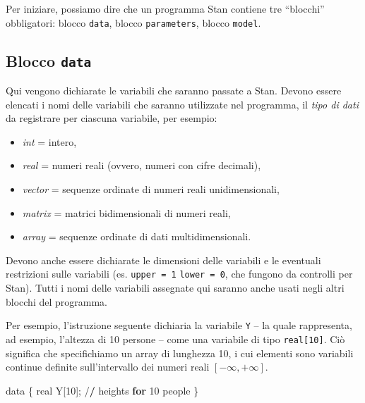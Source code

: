 \documentclass[
  11pt,
]{krantz}
\makeatletter
\newenvironment{Shaded}{\begin{snugshade}}{\end{snugshade}}
\newcommand{\ControlFlowTok}[1]{\textcolor[rgb]{0.27,0.27,0.27}{\textbf{#1}}}
\newcommand{\DecValTok}[1]{\textcolor[rgb]{0.06,0.06,0.06}{#1}}
\newcommand{\ErrorTok}[1]{\textcolor[rgb]{0.14,0.14,0.14}{\textbf{#1}}}
\newcommand{\NormalTok}[1]{#1}
\newcommand{\SpecialCharTok}[1]{\textcolor[rgb]{0,0,0}{#1}}
\providecommand{\tightlist}{%
  \setlength{\itemsep}{0pt}\setlength{\parskip}{0pt}}
\newenvironment{kframe}{%
\medskip{}
\setlength{\fboxsep}{.8em}
 \def\at@end@of@kframe{}%
 \ifinner\ifhmode%
  \def\at@end@of@kframe{\end{minipage}}%
  \begin{minipage}{\columnwidth}%
 \fi\fi%
 \def\FrameCommand##1{\hskip\@totalleftmargin \hskip-\fboxsep
 \colorbox{shadecolor}{##1}\hskip-\fboxsep
     \hskip-\linewidth \hskip-\@totalleftmargin \hskip\columnwidth}%
 \MakeFramed {\advance\hsize-\width
   \@totalleftmargin\z@ \linewidth\hsize
   \@setminipage}}%
 {\par\unskip\endMakeFramed%
 \at@end@of@kframe}
\renewenvironment{Shaded}{\begin{kframe}}{\end{kframe}}
\theoremstyle{definition}
\theoremstyle{definition}
\theoremstyle{definition}
\theoremstyle{definition}
\theoremstyle{remark}
\makeatother
\begin{document}
Per iniziare, possiamo dire che un programma Stan contiene tre ``blocchi'' obbligatori: blocco \texttt{data}, blocco \texttt{parameters}, blocco \texttt{model}.

\hypertarget{blocco-data}{%
\subsection{\texorpdfstring{Blocco \texttt{data}}{Blocco data}}\label{blocco-data}}

Qui vengono dichiarate le variabili che saranno passate a Stan. Devono essere elencati i nomi delle variabili che saranno utilizzate nel programma, il \emph{tipo di dati} da registrare per ciascuna variabile, per esempio:

\begin{itemize}
\tightlist
\item
  \emph{int} = intero,
\item
  \emph{real} = numeri reali (ovvero, numeri con cifre decimali),
\item
  \emph{vector} = sequenze ordinate di numeri reali unidimensionali,
\item
  \emph{matrix} = matrici bidimensionali di numeri reali,
\item
  \emph{array} = sequenze ordinate di dati multidimensionali.
\end{itemize}

Devono anche essere dichiarate le dimensioni delle variabili e le eventuali restrizioni sulle variabili (es. \texttt{upper\ =\ 1} \texttt{lower\ =\ 0}, che fungono da controlli per Stan). Tutti i nomi delle variabili assegnate qui saranno anche usati negli altri blocchi del programma.

Per esempio, l'istruzione seguente dichiaria la variabile \texttt{Y} -- la quale rappresenta, ad esempio, l'altezza di 10 persone -- come una variabile di tipo \texttt{real{[}10{]}}. Ciò significa che specifichiamo un array di lunghezza 10, i cui elementi sono variabili continue definite sull'intervallo dei numeri reali \([-\infty, +\infty]\).

\begin{Shaded}
\begin{Highlighting}[]
\NormalTok{data \{}
\NormalTok{  real Y[}\DecValTok{10}\NormalTok{]; }\SpecialCharTok{/}\ErrorTok{/}\NormalTok{ heights }\ControlFlowTok{for} \DecValTok{10}\NormalTok{ people}
\NormalTok{\}}
\end{Highlighting}
\end{Shaded}
\end{document}
